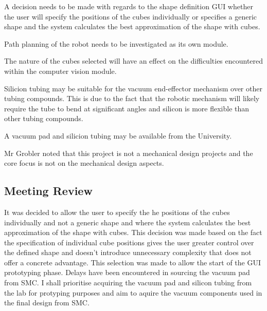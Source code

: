 \begin{compactitem}
    \item A decision needs to be made with regards to the shape definition GUI whether the user will specify the positions of the cubes individually or specifies a generic shape and the system calculates the best approximation of the shape with cubes.
    \item Path planning of the robot needs to be investigated as its own module.
    \item The nature of the cubes selected will have an effect on the difficulties encountered within the computer vision module.
    \item Silicion tubing may be suitable for the vacuum end-effector mechanism over other tubing compounds. This is due to the fact that the robotic mechanism will likely require the tube to bend at significant angles and silicon is more flexible than other tubing compounds.
    \item A vacuum pad and silicion tubing may be available from the University.
    \item Mr Grobler noted that this project is not a mechanical design projects and the core focus is not on the mechanical design aspects.
\end{compactitem}

\subsection{Meeting Review}

It was decided to allow the user to specify the he positions of the cubes individually and not a generic shape and where the system calculates the best approximation of the shape with cubes. This decision was made based on the fact the specification of individual cube positions gives the user greater control over the defined shape and doesn't introduce unnecessary complexity that does not offer a concrete advantage. This selection was made to allow the start of the GUI prototyping phase. Delays have been encountered in sourcing the vacuum pad from SMC. I shall prioritise acquiring the vacuum pad and silicon tubing from the lab for protyping purposes and aim to aquire the vacuum components used in the final design from SMC.

\pendsign